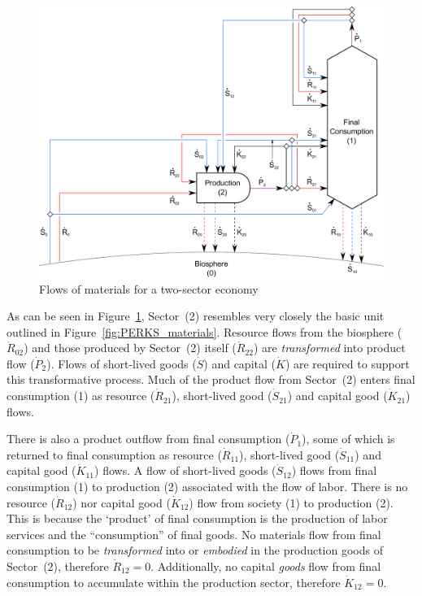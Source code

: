 \begin{figure}[!ht]
\centering
\includegraphics[width=0.8\linewidth]{Part_1/Chapter_Materials/images/2_sector_materials.pdf}
\caption[Flows of materials for a two-sector economy]{Flows of materials for a two-sector economy}
\label{fig:B_materials}
\end{figure}

As can be seen in Figure~\ref{fig:B_materials}, 
Sector~(2) resembles very closely the basic unit
outlined in Figure~\ref{fig:PERKS_materials}. 
Resource flows from the biosphere ($\dot{R}_{02}$)
and those produced by Sector~(2) itself ($\dot{R}_{22}$) 
are \emph{transformed} into product flow
($\dot{P}_{2}$). 
Flows of short-lived goods ($\dot{S}$) 
and capital ($\dot{K}$) are required to
support this transformative process. 
Much of the product flow from Sector~(2) 
enters final consumption (1) as resource ($\dot{R}_{21}$), 
short-lived good ($\dot{S}_{21}$) 
and capital good ($\dot{K}_{21}$)
flows.

There is also a product outflow 
from final consumption ($\dot{P}_{1}$), 
some of which is returned to final consumption
as resource ($\dot{R}_{11}$), 
short-lived good ($\dot{S}_{11}$) 
and capital good ($\dot{K}_{11}$) flows. 
A flow of short-lived goods ($\dot{S}_{12}$)
flows from final consumption (1) to production (2) 
associated with the flow of labor. 
There is no resource ($\dot{R}_{12}$) nor 
capital good ($\dot{K}_{12}$) flow from 
society (1) to production (2). 
This is because the `product' of final consumption
is the production of labor services 
and the ``consumption'' of final goods. 
No materials flow from final consumption to be 
\emph{transformed} into or \emph{embodied} 
in the production goods of Sector~(2), 
therefore $\dot{R}_{12} = 0$. 
Additionally, no capital \emph{goods} flow 
from final consumption to accumulate
within the production sector, 
therefore $\dot{K}_{12} = 0$.


